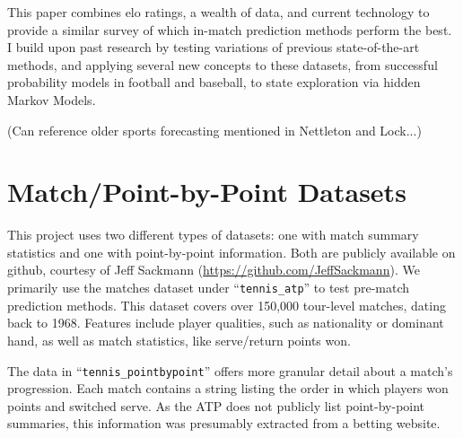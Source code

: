 \documentclass[chapterprefix=false]{report}
\begin{document}

This paper combines elo ratings, a wealth of data, and current technology to provide a similar survey of which in-match prediction methods perform the best. I build upon past research by testing variations of previous state-of-the-art methods, and applying several new concepts to these datasets, from successful probability models in football and baseball, to state exploration via hidden Markov Models.

 (Can reference older sports forecasting mentioned in Nettleton and Lock...)

 
\section{Match/Point-by-Point Datasets}
 
 This project uses two different types of datasets: one with match summary statistics and one with point-by-point information. Both are publicly available on github, courtesy of Jeff Sackmann (\url{https://github.com/JeffSackmann}). We primarily use the matches dataset under ``\texttt{tennis\_atp}'' to test pre-match prediction methods. This dataset covers over 150,000 tour-level matches, dating back to 1968. Features include player qualities, such as nationality or dominant hand, as well as match statistics, like serve/return points won.
 
 
 The data in ``\texttt{tennis\_pointbypoint}'' offers more granular detail about a match's progression. Each match contains a string listing the order in which players won points and switched serve. As the ATP does not publicly list point-by-point summaries, this information was presumably extracted from a betting website.
\end{document}
